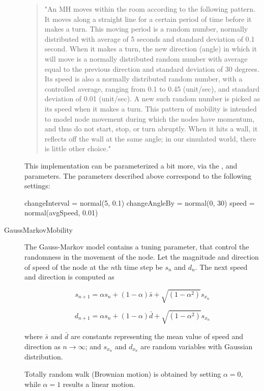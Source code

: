 \begin{description}
\begin{quote}
"An MH moves within the room according to the following pattern. It moves
along a straight line for a certain period of time before it makes a turn.
This moving period is a random number, normally distributed with average of
5 seconds and standard deviation of 0.1 second. When it makes a turn, the
new direction (angle) in which it will move is a normally distributed
random number with average equal to the previous direction and standard
deviation of 30 degrees. Its speed is also a normally distributed random
number, with a controlled average, ranging from 0.1 to 0.45 (unit/sec), and
standard deviation of 0.01 (unit/sec). A new such random number is picked
as its speed when it makes a turn. This pattern of mobility is intended to
model node movement during which the nodes have momentum, and thus do not
start, stop, or turn abruptly. When it hits a wall, it reflects off the
wall at the same angle; in our simulated world, there is little other
choice."
\end{quote}

This implementation can be parameterized a bit more, via the
,  and  parameters.
The parameters described above correspond to the following settings:

\begin{inifile}
changeInterval = normal(5, 0.1)
changeAngleBy = normal(0, 30)
speed = normal(avgSpeed, 0.01)
\end{inifile}

\item[GaussMarkovMobility] The Gauss-Markov model contains a tuning
parameter, that control the randomness in the movement of the node.
Let the magnitude and direction of speed of the node at the $n$th time step be
$s_n$ and $d_n$. The next speed and direction is computed as

$$ s_{n+1} = \alpha s_n + (1 - \alpha) \bar{s} +
             \sqrt{(1-\alpha^2)} s_{x_n} $$

$$ d_{n+1} = \alpha s_n + (1 - \alpha) \bar{d} +
             \sqrt{(1-\alpha^2)} s_{x_n} $$

where $\bar{s}$ and $\bar{d}$ are constants representing the mean value
of speed and direction as $n \to \infty$; and $s_{x_n}$ and $d_{x_n}$
are random variables with Gaussian distribution.

Totally random walk (Brownian motion) is obtained by setting $\alpha=0$,
while $\alpha=1$ results a linear motion.


\end{description}

